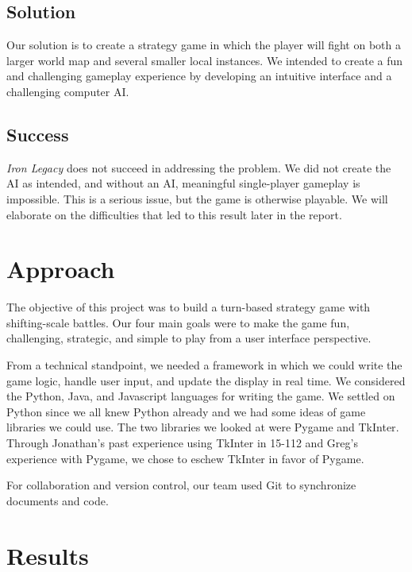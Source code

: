 \documentclass{article}
\begin{document}
\subsection*{Solution}
Our solution is to create a strategy game in which the player will fight on
both a larger world map and several smaller local instances.
We intended to create a fun and challenging gameplay experience by developing
an intuitive interface and a challenging computer AI.

\subsection*{Success}
\emph{Iron Legacy} does not succeed in addressing the problem.
We did not create the AI as intended, and without an AI, meaningful 
single-player gameplay is impossible.
This is a serious issue, but the game is otherwise playable.
We will elaborate on the difficulties that led to this result later in the 
report.

\section*{Approach}
The objective of this project was to build a turn-based strategy game with 
shifting-scale battles.
Our four main goals were to make the game fun, challenging, strategic, and 
simple to play from a user interface perspective.

From a technical standpoint, we needed a framework in which we could write the
game logic, handle user input, and update the display in real time.
We considered the Python\cite{Python}, Java\cite{Java}, and 
Javascript\cite{Javascript} languages for writing the game. 
We settled on Python since we all knew Python already and we had some ideas of
game libraries we could use.
The two libraries we looked at were Pygame\cite{Pygame} and 
TkInter\cite{TkInter}.
Through Jonathan's past experience using TkInter in 15-112 and Greg's 
experience with Pygame, we chose to eschew TkInter in favor of Pygame.

For collaboration and version control, our team used Git \cite{Git} to
synchronize documents and code.

\section*{Results}
\end{document}
